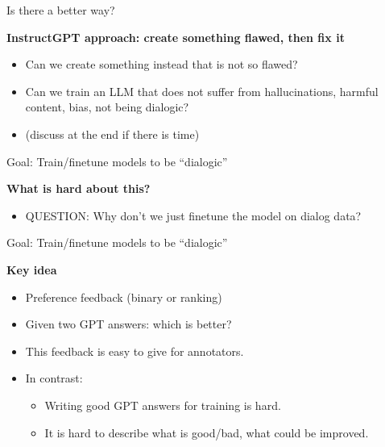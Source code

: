 \begin{vbframe}{Is there a better way?}

\vfill

\textbf{InstructGPT approach: create something flawed, then fix it}

	\begin{itemize}
		\item Can we create something instead that
		is not so flawed?
                \item Can we train an LLM that does not
		suffer from hallucinations, harmful content,
		bias, not being dialogic?
\item (discuss at the end if there is time)
	\end{itemize}

\vfill

\end{vbframe}



\begin{vbframe}{Goal: Train/finetune models to be ``dialogic''}

\vfill

\textbf{What is hard about this?}

	\begin{itemize}
		\item QUESTION: Why don't we just finetune the model
		on dialog data?
	\end{itemize}

\vfill

\end{vbframe}

\begin{vbframe}{Goal: Train/finetune models to be ``dialogic''}

\vfill

\textbf{Key idea}

	\begin{itemize}
		\item Preference feedback (binary or
                  ranking)
                  \item Given two GPT answers: which is
                    better?
                    \item This feedback is easy to give for
                      annotators.
                      \item In contrast:
	\begin{itemize}
                    \item Writing good GPT answers for
                      training is hard.
                    \item It is hard to describe what is good/bad,
                      what could be improved.
	\end{itemize}
	\end{itemize}

\vfill

\end{vbframe}


